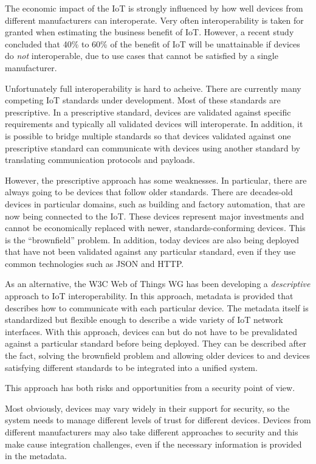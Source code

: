 The economic impact of the IoT is strongly influenced by how well devices from 
different manufacturers can interoperate.
Very often interoperability is taken for granted when estimating the business
benefit of IoT. 
However, a recent study \cite{McK2015a}
concluded that 40\% to 60\% of the 
benefit of IoT will be unattainable if devices do \emph{not} interoperable,
due to use cases that cannot be satisfied by a single manufacturer.

Unfortunately full interoperability is hard to acheive.
There are currently many competing IoT standards under development.
Most of these standards are prescriptive.
In a prescriptive standard, devices are validated against specific requirements
and typically all validated devices will interoperate.
In addition, it is possible to bridge multiple standards so that
devices validated against one prescriptive standard can communicate with
devices using another standard by translating communication protocols and payloads.

However, the prescriptive approach has some weaknesses.
In particular, there are always going to be devices that follow older standards.
There are decades-old devices in particular domains, such as building and factory
automation, that are now being connected to the IoT.
These devices represent major investments and cannot be economically replaced with newer,
standards-conforming devices.  This is the ``brownfield'' problem.
In addition, today devices are also being deployed that have not been validated
against any particular standard,
even if they use common technologies such as JSON and HTTP.

As an alternative, the W3C Web of Things WG has been developing a \emph{descriptive} 
approach to IoT interoperability.
In this approach,
metadata is provided that describes how to communicate with each particular device.
The metadata itself is standardized but flexible enough to describe a wide variety of
IoT network interfaces.
With this approach, devices can but do not have to be prevalidated against 
a particular standard before being deployed.
They can be described after the fact,
solving the brownfield problem and allowing
older devices to and devices satisfying different standards to be integrated into
a unified system.  

This approach has both risks and opportunities from a security point of view.

Most obviously, devices may vary widely in their support for security,
so the system needs to manage different levels of trust for different devices.
Devices from different manufacturers may also take different approaches to
security and this make cause integration challenges, even if the necessary
information is provided in the metadata.

